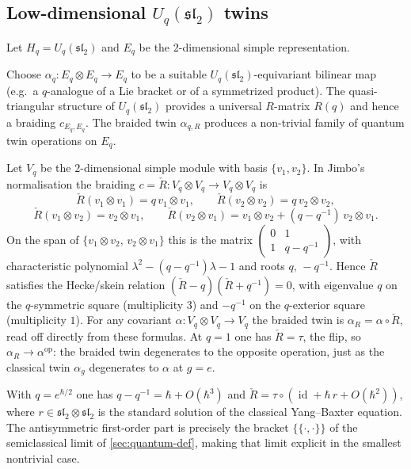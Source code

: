 \documentclass[11pt,a4paper]{article}
\numberwithin{equation}{section}
\DeclareMathOperator{\id}{id}
\begin{document}
	\subsection{Low-dimensional $U_q(\mathfrak{sl}_2)$ twins}
	
	Let $H_q=U_q(\mathfrak{sl}_2)$ and $E_q$ be the 2-dimensional simple representation.
	
	\begin{example}
		Choose $\alpha_q:E_q\otimes E_q\to E_q$ to be a suitable $U_q(\mathfrak{sl}_2)$-equivariant bilinear map
		(e.g.\ a $q$-analogue of a Lie bracket or of a symmetrized product). The quasi-triangular structure
		of $U_q(\mathfrak{sl}_2)$ provides a universal $R$-matrix $R(q)$ and hence a braiding $c_{E_q,E_q}$.
		The braided twin $\alpha_{q,R}$ produces a non-trivial family of quantum twin operations on $E_q$.
	\end{example}
	
	\begin{example}\label{ex:Uqsl2-R}
		Let $V_q$ be the $2$-dimensional simple module with basis $\{v_1,v_2\}$. In Jimbo's normalisation the
		braiding $c=\check R:V_q\otimes V_q\to V_q\otimes V_q$ is
		\[
			\check R(v_1\otimes v_1)=q\,v_1\otimes v_1,\qquad \check R(v_2\otimes v_2)=q\,v_2\otimes v_2,
		\]
		\[
			\check R(v_1\otimes v_2)=v_2\otimes v_1,\qquad
			\check R(v_2\otimes v_1)=v_1\otimes v_2+(q-q^{-1})\,v_2\otimes v_1.
		\]
		On the span of $\{v_1\otimes v_2,\,v_2\otimes v_1\}$ this is the matrix
		$\left(\begin{smallmatrix}0&1\\1&q-q^{-1}\end{smallmatrix}\right)$, with characteristic polynomial
		$\lambda^2-(q-q^{-1})\lambda-1$ and roots $q,\,-q^{-1}$. Hence $\check R$ satisfies the Hecke/skein relation
		$(\check R-q)(\check R+q^{-1})=0$, with eigenvalue $q$ on the $q$-symmetric square (multiplicity $3$) and
		$-q^{-1}$ on the $q$-exterior square (multiplicity $1$). For any covariant $\alpha:V_q\otimes V_q\to V_q$ the
		braided twin is $\alpha_R=\alpha\circ\check R$, read off directly from these formulas. At $q=1$ one has
		$\check R=\tau$, the flip, so $\alpha_R\to\alpha^{\mathrm{op}}$: the braided twin degenerates to the opposite
		operation, just as the classical twin $\alpha_g$ degenerates to $\alpha$ at $g=e$.
	\end{example}

	\begin{remark}\label{rem:r-matrix}
		With $q=e^{\hbar/2}$ one has $q-q^{-1}=\hbar+O(\hbar^3)$ and $\check R=\tau\circ(\id+\hbar\,r+O(\hbar^2))$,
		where $r\in\mathfrak{sl}_2\otimes\mathfrak{sl}_2$ is the standard solution of the classical Yang--Baxter
		equation. The antisymmetric first-order part is precisely the bracket $\{\!\{\cdot,\cdot\}\!\}$ of the
		semiclassical limit of \cref{sec:quantum-def}, making that limit explicit in the smallest nontrivial case.
	\end{remark}
\end{document}
